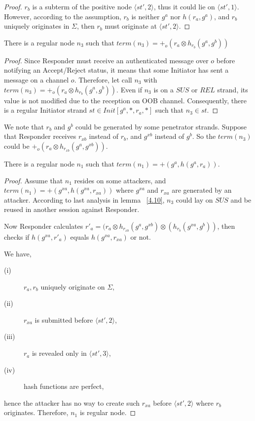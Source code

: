 \begin{proof}
$r_b$ is a subterm of the positive node $\langle st',2 \rangle$, thus it could lie on $\langle st',1 \rangle$. However, according to the assumption, $r_b$ is neither $g^a$ nor $h(r_a,g^a)$, and $r_b$ uniquely originates in $\Sigma$, then $r_b$ must originate at $\langle st',2 \rangle$.
\end{proof}
 
\begin{Lemma}\label{4.10}
There is a regular node $n_3$ such that $term(n_3)= +_o(r_a \otimes h_{r_b}(g^a,g^b))$ 
\end{Lemma}

\begin{proof}
Since Responder must receive an authenticated message over $o$ before notifying an Accept/Reject status, it means that some Initiator has sent a message on a channel $o$. Therefore, let call $n_3$ with $term(n_3)= +_o(r_a \otimes h_{r_b}(g^a,g^b))$. Even if $n_3$ is on a $SUS$ or $REL$ strand, its value is not modified due to the reception on OOB channel. Consequently, there is a regular Initiator strand $st \in Init[g^a,*, r_a,*]$ such that $n_3 \in st$. 
\end{proof}

We note that $r_b$ and $g^b$ could be generated by some penetrator strands. Suppose that Responder receives $r_{xb}$ instead of $r_b$, and $g^{xb}$ instead of $g^b$. So the $term(n_3)$ could be $+_o(r_a \otimes h_{r_{xb}}(g^a,g^{xb}))$.

\begin{Lemma}\label{4.11}
There is a regular node $n_1$ such that $term(n_1)= +(g^a,h(g^a,r_a))$.
\end{Lemma}

\begin{proof}
Assume that $n_1$ resides on some attackers, and $term(n_1) = +(g^{xa},h(g^{xa},r_{xa}))$ where $g^{xa}$ and $r_{xa}$ are generated by an attacker. According to last analysis in lemma ~\ref{4.10}, $n_3$ could lay on $SUS$ and be reused in another session against Responder. 

Now Responder calculates $r'_{a} = (r_a \otimes h_{r_{xb}}(g^a,g^{xb}) \otimes (h_{r_b}(g^{xa},g^b))$, then checks if $h(g^{xa},r'_{a})$ equals $h(g^{xa},r_{xa})$ or not. 

We have,
\begin{description} 
 \item [(i)] $r_a, r_b$ uniquely originate on $\Sigma$, 
 \item [(ii)] $r_{xa}$ is submitted before $\langle st',2\rangle$, 
 \item [(iii)] $r_{a}$ is revealed only in $\langle st',3 \rangle$, 
 \item [(iv)] hash functions are perfect, 
\end{description}
hence the attacker has no way to create such $r_{xa}$ before $\langle st',2 \rangle$ where $r_b$ originates. Therefore, $n_1$ is regular node. 
 \end{proof}

